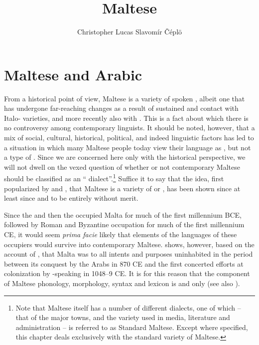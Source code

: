 \documentclass[output=paper]{langsci/langscibook}
\title{Maltese}
\author{Christopher Lucas\affiliation{SOAS University of London}\lastand
 Slavomír Čéplö\affiliation{Institute of Oriental Studies, Slovak Academy of Sciences / IMAFO Abteilung Byzanzforschung, Österreichische Akademie der Wissenschaften}
}
\begin{document}
\maketitle
\section{Maltese and Arabic} %
From a historical point of view, Maltese is a variety of spoken , albeit one that has undergone far-reaching changes as a result of sustained and  contact with Italo- varieties, and more recently also with . This is a fact about which there is no controversy among contemporary linguists. It should be noted, however, that a mix of social, cultural, historical, political, and indeed linguistic factors has led to a situation in which many Maltese people today view their language as , but not a type of . Since we are concerned here only with the historical perspective, we will not dwell on the vexed question of whether or not contemporary Maltese should be classified as an `` dialect''.\footnote{Note that Maltese itself has a number of different dialects, one of which -- that of the major towns, and the variety used in media, literature and administration -- is referred to as  Standard Maltese. Except where specified, this chapter deals exclusively with the standard variety of Maltese.} Suffice it to say that the idea, first popularized by \cite{desoldanis1750} and \cite{vassalli1791}, that Maltese is a variety of  or , has been shown since at least since \cite{gesenius1810} and \cite{desacy1829} to be entirely without merit.

Since the  and then the  occupied Malta for much of the first millennium BCE, followed by Roman and Byzantine occupation for much of the first millennium CE, it would seem \textit{prima facie} likely that elements of the languages of these occupiers would survive into contemporary Maltese. \cite{brincat1995} shows, however, based on the account of , that Malta was to all intents and purposes uninhabited in the period between its conquest by the Arabs in 870 CE and the first concerted efforts at colonization by -speaking  in 1048--9 CE. It is for this reason that the  component of Maltese phonology, morphology, syntax and lexicon is  and  only (see also \citealt{grech1961}).
\end{document}
